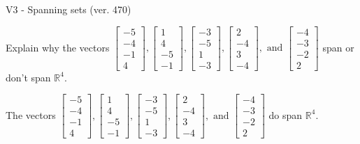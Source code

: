 \begin{exercise}
  \begin{exerciseTitle}V3 - Spanning sets (ver. 470)\end{exerciseTitle}
  \begin{exerciseStatement}
    Explain why the vectors \(\left[\begin{array}{r}
-5 \\
-4 \\
-1 \\
4
\end{array}\right] , \left[\begin{array}{r}
1 \\
4 \\
-5 \\
-1
\end{array}\right] , \left[\begin{array}{r}
-3 \\
-5 \\
1 \\
-3
\end{array}\right] , \left[\begin{array}{r}
2 \\
-4 \\
3 \\
-4
\end{array}\right] , \text{ and } \left[\begin{array}{r}
-4 \\
-3 \\
-2 \\
2
\end{array}\right]\) span or don't span \(\mathbb{R}^4\). 
	


  \end{exerciseStatement}
  \begin{exerciseAnswer}
   The vectors \(\left[\begin{array}{r}
-5 \\
-4 \\
-1 \\
4
\end{array}\right] , \left[\begin{array}{r}
1 \\
4 \\
-5 \\
-1
\end{array}\right] , \left[\begin{array}{r}
-3 \\
-5 \\
1 \\
-3
\end{array}\right] , \left[\begin{array}{r}
2 \\
-4 \\
3 \\
-4
\end{array}\right] , \text{ and } \left[\begin{array}{r}
-4 \\
-3 \\
-2 \\
2
\end{array}\right]\) 
  	 do  
	span \(\mathbb{R}^4\).
  



\end{exerciseAnswer}
\end{exercise}
